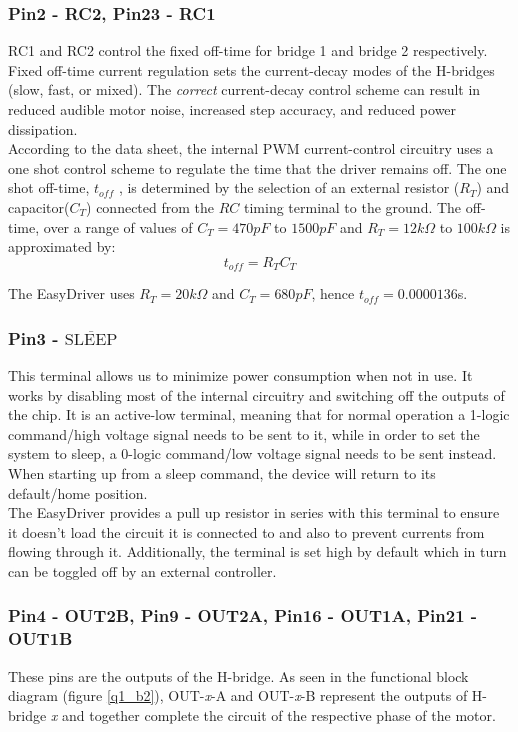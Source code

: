 \documentclass{article}
\theoremstyle{plain}
\theoremstyle{definition}
\theoremstyle{remark}
\begin{document}
\subsubsection*{Pin2 - RC2, Pin23 - RC1}
RC1 and RC2 control the fixed off-time for bridge 1 and bridge 2 respectively. Fixed off-time current regulation sets the current-decay modes of the H-bridges (slow, fast, or mixed).  The \emph{correct} current-decay control scheme can result in reduced audible motor noise, increased step accuracy, and reduced power dissipation.\\

According to the data sheet, the internal PWM current-control circuitry uses a one shot control scheme to regulate the time that the driver remains off.  The one shot off-time, $t_{off}$ , is determined by the selection of an external resistor ($R_T$) and capacitor($C_T$) connected from the $RC$ timing terminal to the ground. The off-time, over a range of values of $C_T = 470 pF$ to $1500 pF$ and $R_T = 12 k\Omega$ to $100 k\Omega$ is approximated by:
$$t_{off} = R_T C_T$$

The EasyDriver uses $R_T = 20k\Omega$ and $C_T = 680 pF$, hence $t_{off} = 0.0000136$s.\\

\subsubsection*{Pin3 - $\overline{\text{SLEEP}}$}
This terminal allows us to minimize power consumption when not in use. It works by disabling most of the internal circuitry and switching off the outputs of the chip. It is an active-low terminal, meaning that for normal operation a 1-logic command/high voltage signal needs to be sent to it, while in order to set the system to sleep, a 0-logic command/low voltage signal needs to be sent instead. When starting up from a sleep command, the device will return to its default/home position.\\

The EasyDriver provides a pull up resistor in series with this terminal to ensure it doesn't load the circuit it is connected to and also to prevent currents from flowing through it. Additionally, the terminal is set high by default which in turn can be toggled off by an external controller.


\subsubsection*{Pin4 - OUT2B, Pin9 - OUT2A, Pin16 - OUT1A, Pin21 - OUT1B}
These pins are the outputs of the H-bridge. As seen in the functional block diagram (figure \ref{q1_b2}), OUT-\emph{x}-A and OUT-\emph{x}-B represent the outputs of H-bridge \emph{x} and together complete the circuit of the respective phase of the motor.\\
\end{document}
